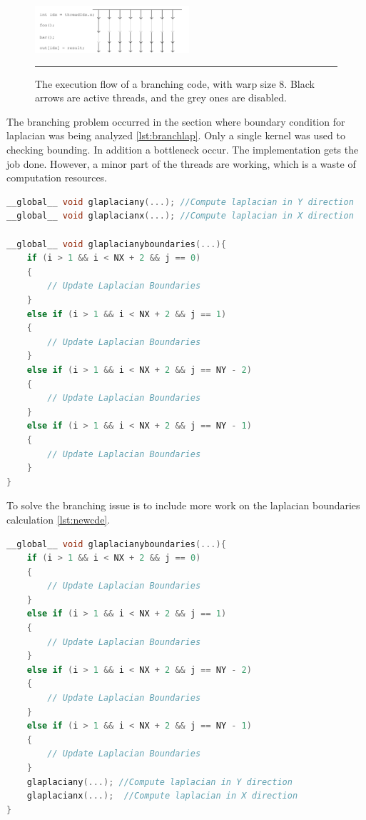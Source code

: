 \begin{figure}[htbp]
	\centering
		\includegraphics[width=0.51\textwidth]{Figures/threads.png}
		\rule{35em}{0.2pt}
	\caption[he execution flow]{The execution flow of a branching code, with warp size 8. Black arrows are active threads, and the grey ones are disabled.}
	\label{fig:threads}
\end{figure}

The branching problem occurred in the section where boundary condition for laplacian was being analyzed \ref{lst:branchlap}. Only a single kernel was used to checking bounding. In addition a bottleneck occur. The implementation gets the job done. However, a minor part of the threads are working, which is a waste of computation resources.

\begin{lstlisting}[language=C++, label={lst:branchlap}, caption={Branching problem in the laplacian boundary condition evaluation}]
__global__ void glaplaciany(...); //Compute laplacian in Y direction
__global__ void glaplacianx(...); //Compute laplacian in X direction

__global__ void glaplacianyboundaries(...){
    if (i > 1 && i < NX + 2 && j == 0)
    {
     	// Update Laplacian Boundaries
    }
    else if (i > 1 && i < NX + 2 && j == 1)
    {
  		// Update Laplacian Boundaries
    }
    else if (i > 1 && i < NX + 2 && j == NY - 2)
    {
        // Update Laplacian Boundaries
    }
    else if (i > 1 && i < NX + 2 && j == NY - 1)
    {
        // Update Laplacian Boundaries
    }
}
\end{lstlisting}

To solve the branching issue is to include more work on the laplacian boundaries calculation \ref{lst:newcde}.
\begin{lstlisting}[language=C++, label={lst:newcde}, caption={More workload on a single kernel execution}]
__global__ void glaplacianyboundaries(...){
    if (i > 1 && i < NX + 2 && j == 0)
    {
     	// Update Laplacian Boundaries
    }
    else if (i > 1 && i < NX + 2 && j == 1)
    {
  		// Update Laplacian Boundaries
    }
    else if (i > 1 && i < NX + 2 && j == NY - 2)
    {
        // Update Laplacian Boundaries
    }
    else if (i > 1 && i < NX + 2 && j == NY - 1)
    {
        // Update Laplacian Boundaries
    }
    glaplaciany(...); //Compute laplacian in Y direction
	glaplacianx(...);  //Compute laplacian in X direction
}
\end{lstlisting}

